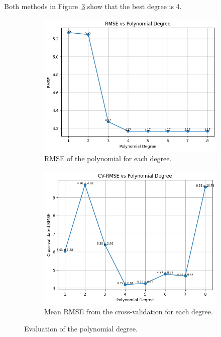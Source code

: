 \documentclass[a4paper]{article}
\begin{document}
Both methods in Figure~\ref{fig:degrees} show that the best degree is 4.

\begin{figure}[htbp]
  \centering
  \begin{subfigure}[t]{0.4\textwidth}
    \centering
    \includegraphics[width=\textwidth]{images/degrees_rmse.png}
    \caption{
      RMSE of the polynomial for each degree.
    }\label{fig:rmse}
  \end{subfigure}
  \hfill
  \begin{subfigure}[t]{0.4\textwidth}
    \centering
    \includegraphics[width=\textwidth]{images/cv_degrees_rmse.png}
    \caption{
      Mean RMSE from the cross-validation for each degree.
    }\label{fig:cv-rmse}
  \end{subfigure}
  \caption{
    Evaluation of the polynomial degree.
  }\label{fig:degrees}
\end{figure}
\end{document}
